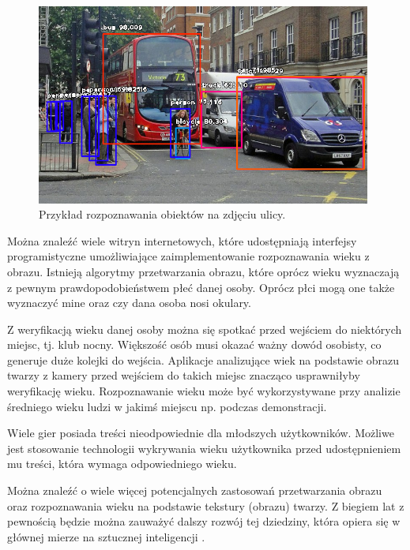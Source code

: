 \documentclass[a4paper,twoside,12pt]{book}
\begin{document}
    \begin{figure}
        \centering
        \includegraphics[width=11cm]{Obrazy/rozpoznawanieObiektow}
        \caption{Przykład rozpoznawania obiektów na zdjęciu ulicy. \cite{rozpoznawanieObiektow}}
        \label{fig.rozpoznawanieObiektow}
    \end{figure}

    Można znaleźć wiele witryn internetowych, które udostępniają interfejsy programistyczne umożliwiające zaimplementowanie
    rozpoznawania wieku z obrazu.
    Istnieją algorytmy przetwarzania obrazu, które oprócz wieku wyznaczają z pewnym prawdopodobieństwem płeć danej osoby.
    Oprócz płci mogą one także wyznaczyć mine oraz czy dana osoba nosi okulary.

    Z weryfikacją wieku danej osoby można się spotkać przed wejściem do niektórych miejsc, tj.
    klub nocny.
    Większość osób
    musi okazać ważny dowód osobisty,
    co generuje duże kolejki do wejścia.
    Aplikacje analizujące wiek na podstawie obrazu twarzy z kamery przed wejściem
    do takich miejsc znacząco usprawniłyby weryfikację wieku.
    Rozpoznawanie wieku może być wykorzystywane przy analizie średniego wieku ludzi w jakimś miejscu np.
    podczas demonstracji.

    Wiele gier posiada treści nieodpowiednie dla młodszych użytkowników.
    Możliwe jest stosowanie technologii wykrywania
    wieku użytkownika przed udostępnieniem mu treści, która wymaga odpowiedniego wieku.

    Można znaleźć o wiele więcej potencjalnych zastosowań przetwarzania obrazu oraz rozpoznawania wieku na podstawie
    tekstury (obrazu) twarzy.
    Z biegiem lat z pewnością będzie można zauważyć dalszy rozwój tej dziedziny, która
    opiera się w głównej mierze na sztucznej inteligencji \cite{computerVision}.
\end{document}

